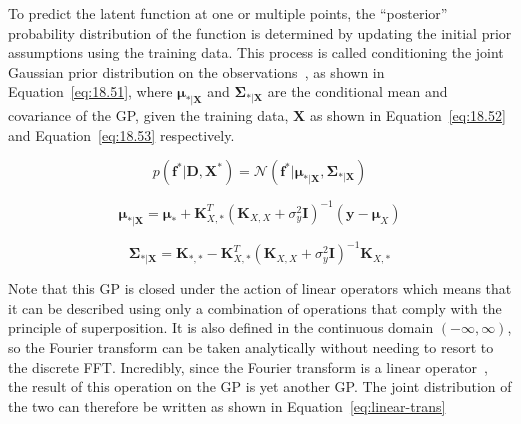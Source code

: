 \documentclass[12pt]{article}
\begin{document}
    To predict the latent function at one or multiple points, the ``posterior'' probability distribution of the function is determined by updating the initial prior assumptions using the training data.
    This process is called conditioning the joint Gaussian prior distribution on the observations~\cite{rasmussen2006gaussian}, as shown in Equation~\ref{eq:18.51}, where $\boldsymbol{\mu}_{*\vert \mathbf{X}}$ and $\boldsymbol{\Sigma}_{*\vert \mathbf{X}}$ are the conditional mean and covariance of the GP, given the training data, $\mathbf{X}$ as shown in Equation~\ref{eq:18.52} and Equation~\ref{eq:18.53} respectively.

    \begin{equation}
        p(\mathbf{f}^* \vert \mathbf{D}, \mathbf{X}^*) = \mathcal{N}(\mathbf{f}^* \vert \boldsymbol{\mu}_{*\vert \mathbf{X}}, \boldsymbol{\Sigma}_{*\vert \mathbf{X}})\label{eq:18.51}
    \end{equation}

    \begin{equation}
        \boldsymbol{\mu}_{*\vert \mathbf{X}} = \boldsymbol{\mu}_* + \mathbf{K}_{X,*}^T (\mathbf{K}_{X,X} + \sigma^2_y \mathbf{I})^{-1} (\mathbf{y} - \boldsymbol{\mu}_X)\label{eq:18.52}
    \end{equation}

    \begin{equation}
        \boldsymbol{\Sigma}_{*\vert \mathbf{X}} = \mathbf{K}_{*,*} - \mathbf{K}_{X,*}^T (\mathbf{K}_{X,X} + \sigma^2_y \mathbf{I})^{-1} \mathbf{K}_{X,*}\label{eq:18.53}
    \end{equation}


    Note that this GP is closed under the action of linear operators which means that it can be described using only a combination of operations that comply with the principle of superposition.
    It is also defined in the continuous domain $(-\infty, \infty)$, so the Fourier transform can be taken analytically without needing to resort to the discrete FFT\@.
    Incredibly, since the Fourier transform is a linear operator~\cite{Jidling2017}, the result of this operation on the GP is yet another GP. The joint distribution of the two can therefore be written as shown in Equation~\ref{eq:linear-trans}
\end{document}
